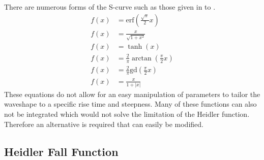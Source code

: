 There are numerous forms of the S-curve such as those given in  to .
\begin{subequations}
    \label{eqn:scurve}
    \begin{align}
        f(x) & = \mathrm{erf} \left ( \frac{\sqrt{\pi}}{2}x \right ) \label{eqn:erf} \\
        f(x) & = \frac{x}{\sqrt{1+x^2}} \label{eqn:sqrt} \\
        f(x) & = \tanh(x) \label{eqn:tanh} \\
        f(x) & = \frac{2}{\pi}\arctan \left ( \frac{\pi}{2}x \right ) \label{eqn:atan} \\
        f(x) & = \frac{2}{\pi}\mathrm{gd} \left ( \frac{\pi}{2}x \right ) \label{eqn:gd} \\
        f(x) & = \frac{x}{1+|x|} \label{eqn:abs}
    \end{align}
\end{subequations}
These equations do not allow for an easy manipulation of parameters to tailor the waveshape to a specific rise time and steepness. Many of these functions can also not be integrated which would not solve the limitation of the Heidler function. Therefore an alternative is required that can easily be modified.



\subsection{Heidler Fall Function}
\label{sub:approx_heidler_fall_function}

